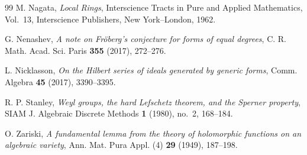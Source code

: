 \documentclass[11pt]{amsart}
\theoremstyle{remark}
\begin{document}
\begin{thebibliography}{99}
M. Nagata,
\emph{Local Rings},
Interscience Tracts in Pure and Applied Mathematics, Vol.~13,
Interscience Publishers, New York--London, 1962.

G. Nenashev,
\emph{A note on Fr\"oberg's conjecture for forms of equal degrees},
C. R. Math. Acad. Sci. Paris \textbf{355} (2017), 272--276.

L. Nicklasson,
\emph{On the Hilbert series of ideals generated by generic forms},
Comm. Algebra \textbf{45} (2017), 3390--3395.

R. P. Stanley,
\emph{Weyl groups, the hard Lefschetz theorem, and the Sperner property},
SIAM J. Algebraic Discrete Methods \textbf{1} (1980), no.~2, 168--184.

O. Zariski,
\emph{A fundamental lemma from the theory of holomorphic functions on an algebraic variety},
Ann. Mat. Pura Appl. (4) \textbf{29} (1949), 187--198.

\end{thebibliography}
\end{document}

